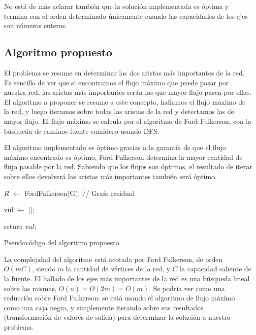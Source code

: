 \documentclass{article}
\begin{document}
No está de más aclarar también que la solución implementada es óptima y termina con el orden determinado únicamente cuando las capacidades de los ejes son números enteros. 

\subsection{Algoritmo propuesto}

El problema se resume en determinar las dos aristas más importantes de la red. Es sencillo de ver que si encontramos el flujo máximo que puede pasar por nuestra red, las aristas más importantes serán las que mayor flujo pasen por ellas. El algoritmo a proponer se resume a este concepto, hallamos el flujo máximo de la red, y luego iteramos sobre todas las aristas de la red y detectamos las de mayor flujo. El flujo máximo se calcula por el algoritmo de Ford Fulkerson, con la búsqueda de caminos fuente-sumidero usando DFS. 

El algoritmo implementado es óptimo gracias a la garantía de que el flujo máximo encontrado es óptimo, Ford Fulkerson determina la mayor cantidad de flujo pasable por la red. Sabiendo que los flujos son óptimos, el resultado de iterar sobre ellos devolverá las aristas más importantes también será óptimo.

\begin{algorithm}
    \BlankLine

    $R$ $\leftarrow$ FordFulkerson(G); // Grafo residual
    
    vul $\leftarrow$ [];

    return $vul$;

    \caption{Pseudocódigo del algoritmo propuesto}
\end{algorithm}

La complejidad del algoritmo está acotada por Ford Fulkerson, de orden $O(mC)$, siendo $m$ la cantidad de vértices de la red, y $C$ la capacidad saliente de la fuente. El hallado de los ejes más importantes de la red es una búsqueda lineal sobre las mismas, $O(n) = O(2m) = O(m)$. Se podría ver como una reducción sobre Ford Fulkerson: se está usando el algoritmo de flujo máximo como una caja negra, y simplemente iterando sobre sus resultados (transformación de valores de salida) para determinar la solución a nuestro problema.
\end{document}
